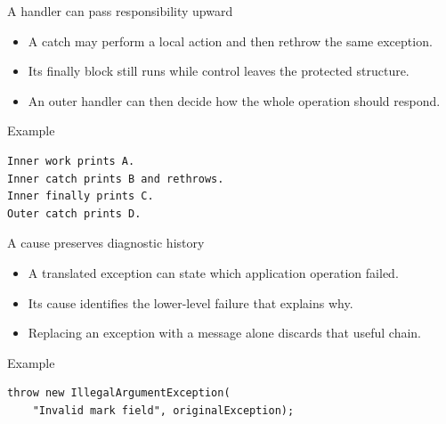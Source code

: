 \documentclass[10pt,aspectratio=169]{beamer}
\begin{document}
\begin{frame}[fragile,t]{A handler can pass responsibility upward}
\begin{itemize}
\item A catch may perform a local action and then rethrow the same exception.
\item Its finally block still runs while control leaves the protected structure.
\item An outer handler can then decide how the whole operation should respond.
\end{itemize}
\vspace{1mm}\begin{block}{Example}
\begin{lstlisting}
Inner work prints A.
Inner catch prints B and rethrows.
Inner finally prints C.
Outer catch prints D.
\end{lstlisting}
\end{block}
\end{frame}

\begin{frame}[fragile,t]{A cause preserves diagnostic history}
\begin{itemize}
\item A translated exception can state which application operation failed.
\item Its cause identifies the lower-level failure that explains why.
\item Replacing an exception with a message alone discards that useful chain.
\end{itemize}
\vspace{1mm}\begin{block}{Example}
\begin{lstlisting}
throw new IllegalArgumentException(
    "Invalid mark field", originalException);
\end{lstlisting}
\end{block}
\end{frame}
\end{document}
